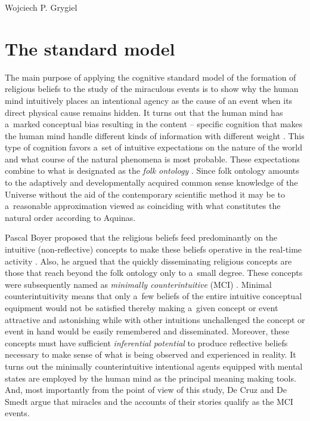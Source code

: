 \begin{artengenv}{Wojciech P. Grygiel}
\section*{The standard model}
The main purpose of applying the cognitive standard model of the formation of religious beliefs to the study of the miraculous events is to show why the human mind intuitively places an intentional agency as the cause of an event when its direct physical cause remains hidden. It turns out that the human mind has a~marked conceptual bias resulting in the content – specific cognition that makes the human mind handle different kinds of information with different weight
\parencite[][pp.35–39]{barrett_cognitive_2011}. %
 This type of cognition favors a~set of intuitive expectations on the nature of the world and what course of the natural phenomena is most probable. These expectations combine to what is designated as the \textit{folk ontology} 
\parencite[e.g.][pp.58–95]{barrett_cognitive_2011}. %
 Since folk ontology amounts to the adaptively and developmentally acquired common sense knowledge of the Universe without the aid of the contemporary scientific method it may be to a~reasonable approximation viewed as coinciding with what constitutes the natural order according to Aquinas.

Pascal Boyer proposed that the religious beliefs feed predominantly on the intuitive (non-reflective) concepts to make these beliefs operative in the real-time activity
\parencite[][]{boyer_religion_2001}. %
 Also, he argued that the quickly disseminating religious concepts are those that reach beyond the folk ontology only to a~small degree. These concepts were subsequently named as \textit{minimally counterintuitive} (MCI) 
\parencite[][]{barrett_exploring_2000}. %
 Minimal counterintuitivity means that only a~few beliefs of the entire intuitive conceptual equipment would not be satisfied thereby making a~given concept or event attractive and astonishing while with other intuitions unchallenged the concept or event in hand would be easily remembered and disseminated. Moreover, these concepts must have sufficient \textit{inferential potential} to produce reflective beliefs necessary to make sense of what is being observed and experienced in reality. It turns out the minimally counterintuitive intentional agents equipped with mental states are employed by the human mind as the principal meaning making tools. And, most importantly from the point of view of this study, De Cruz and De Smedt 
\parencite*[][pp.161–165]{de_cruz_natural_2015} %
 argue that miracles and the accounts of their stories qualify as the MCI events.


\end{artengenv}
